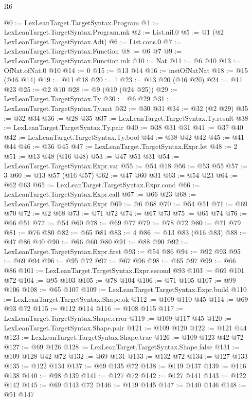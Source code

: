 \begin{lexlean}{R6}
\begin{coremodule}
{{{{{{{{{{{{{{{@0 := LexLeanTarget.TargetSyntax.Program
@1 := LexLeanTarget.TargetSyntax.Program.mk
@2 := List.nil.{0}
@5 := @1 (@2 LexLeanTarget.TargetSyntax.Adt)
@6 := List.cons.{0}
@7 := LexLeanTarget.TargetSyntax.Function
@8 := @6 @7
@9 := LexLeanTarget.TargetSyntax.Function.mk
@10 := Nat
@11 := @6 @10
@13 := OfNat.ofNat.{0} @10
@14 := 0
@15 := @13 @14
@16 := instOfNatNat
@18 := @15 (@16 @14)
@19 := @11 @18
@20 := 1
@23 := @13 @20 (@16 @20)
@24 := @11 @23
@25 := @2 @10
@28 := @9 (@19 (@24 @25))
@29 := LexLeanTarget.TargetSyntax.Ty
@30 := @6 @29
@31 := LexLeanTarget.TargetSyntax.Ty.nat
@32 := @30 @31
@34 := @32 (@2 @29)
@35 := @32 @34
@36 := @28 @35
@37 := LexLeanTarget.TargetSyntax.Ty.result
@38 := LexLeanTarget.TargetSyntax.Ty.pair
@40 := @38 @31 @31
@41 := @37 @40
@42 := LexLeanTarget.TargetSyntax.Ty.bool
@44 := @38 @42 @42
@45 := @41 @44
@46 := @36 @45
@47 := LexLeanTarget.TargetSyntax.Expr.let
@48 := 2
@51 := @13 @48 (@16 @48)
@53 := @47 @51 @31
@54 := LexLeanTarget.TargetSyntax.Expr.var
@55 := @54 @18
@56 := @53 @55
@57 := 3
@60 := @13 @57 (@16 @57)
@62 := @47 @60 @31
@63 := @54 @23
@64 := @62 @63
@65 := LexLeanTarget.TargetSyntax.Expr.cond
@66 := LexLeanTarget.TargetSyntax.Expr.call
@67 := @66 @23
@68 := LexLeanTarget.TargetSyntax.Expr
@69 := @6 @68
@70 := @54 @51
@71 := @69 @70
@72 := @2 @68
@73 := @71 @72
@74 := @67 @73
@75 := @65 @74
@76 := @66 @51
@77 := @54 @60
@78 := @69 @77
@79 := @78 @72
@80 := @71 @79
@81 := @76 @80
@82 := @65 @81
@83 := 4
@86 := @13 @83 (@16 @83)
@88 := @47 @86 @40
@90 := @66 @60 @80
@91 := @88 @90
@92 := LexLeanTarget.TargetSyntax.Expr.first
@93 := @54 @86
@94 := @92 @93
@95 := @69 @94
@96 := @95 @72
@97 := @67 @96
@98 := @65 @97
@99 := @66 @86
@101 := LexLeanTarget.TargetSyntax.Expr.second @93
@103 := @69 @101 @72
@104 := @95 @103
@105 := @78 @104
@106 := @71 @105
@107 := @99 @106
@108 := @65 @107
@109 := LexLeanTarget.TargetSyntax.Expr.build
@110 := LexLeanTarget.TargetSyntax.Shape.ok
@112 := @109 @110 @45
@114 := @69 @93 @72
@115 := @112 @114
@116 := @108 @115
@117 := LexLeanTarget.TargetSyntax.Shape.error
@119 := @109 @117 @45
@120 := LexLeanTarget.TargetSyntax.Shape.pair
@121 := @109 @120
@122 := @121 @44
@123 := LexLeanTarget.TargetSyntax.Shape.true
@126 := @109 @123 @42 @72
@127 := @69 @126
@128 := LexLeanTarget.TargetSyntax.Shape.false
@131 := @109 @128 @42 @72
@132 := @69 @131
@133 := @132 @72
@134 := @127 @133
@135 := @122 @134
@137 := @69 @135 @72
@138 := @119 @137
@139 := @116 @138
@140 := @98 @139
@141 := @127 @72
@142 := @127 @141
@143 := @122 @142
@145 := @69 @143 @72
@146 := @119 @145
@147 := @140 @146
@148 := @91 @147
}}}}}}}}}}}}}}}
\end{coremodule}
\end{lexlean}
